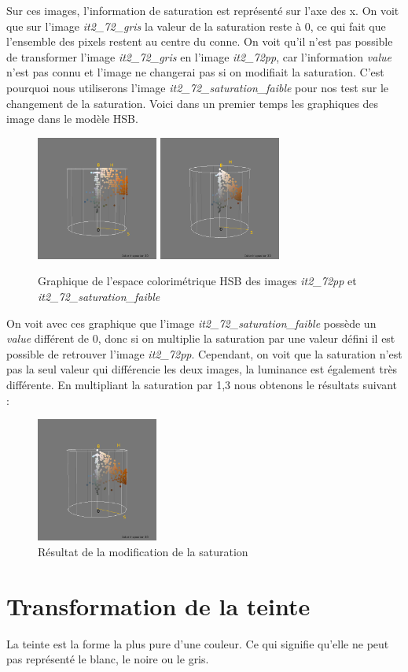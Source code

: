 \documentclass[a4paper,10pt]{article}
\begin{document}
Sur ces images, l'information de saturation est représenté sur l'axe des x. On voit que sur l'image \textit{it2\_72\_gris} la
valeur de la saturation reste à 0, ce qui fait que l'ensemble des pixels restent au centre du conne. On voit qu'il n'est pas
possible de transformer l'image \textit{it2\_72\_gris} en l'image \textit{it2\_72pp}, car l'information \textit{value} n'est pas
connu et l'image ne changerai pas si on modifiait la saturation. C'est pourquoi nous utiliserons l'image \textit{it2\_72\_saturation\_faible}
pour nos test sur le changement de la saturation. Voici dans un premier temps les graphiques des image dans le modèle HSB.

\begin{figure}[!h]
 \begin{center}
 \includegraphics[width=4cm]{resultat/saturation1_2.png}
 \includegraphics[width=4cm]{resultat/saturation2_2.png}
 \caption{Graphique de l'espace colorimétrique HSB des images \textit{it2\_72pp} et \textit{it2\_72\_saturation\_faible}}
 \end{center}
\end{figure}
\newpage

On voit avec ces graphique que l'image \textit{it2\_72\_saturation\_faible} possède un \textit{value} différent de 0, donc si on 
multiplie la saturation par une valeur défini il est possible de retrouver l'image \textit{it2\_72pp}. Cependant, on voit que 
la saturation n'est pas la seul valeur qui différencie les deux images, la luminance est également très différente. En multipliant
la saturation par 1,3 nous obtenons le résultats suivant :

\begin{figure}[!h]
 \begin{center}
 \includegraphics[width=4cm]{resultat/resultat_saturation.png}
 \caption{Résultat de la modification de la saturation}
 \end{center}
\end{figure}

\section{Transformation de la teinte}
La teinte est la forme la plus pure d'une couleur. Ce qui signifie qu'elle ne peut pas représenté le blanc, le noire ou le gris.
\end{document}
